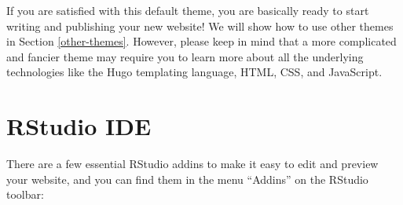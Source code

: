 \documentclass[12pt,]{krantz}
\theoremstyle{definition}
\theoremstyle{definition}
\theoremstyle{definition}
\theoremstyle{remark}
\begin{document}
If you are satisfied with this default theme, you are basically ready to
start writing and publishing your new website! We will show how to use
other themes in Section \ref{other-themes}. However, please keep in mind
that a more complicated and fancier theme may require you to learn more
about all the underlying technologies like the Hugo templating language,
HTML, CSS, and JavaScript.

\hypertarget{rstudio-ide}{%
\section{RStudio IDE}\label{rstudio-ide}}

There are a few essential RStudio addins to make
it easy to edit and preview your website, and you can find them in the
menu ``Addins'' on the RStudio toolbar:
\end{document}
